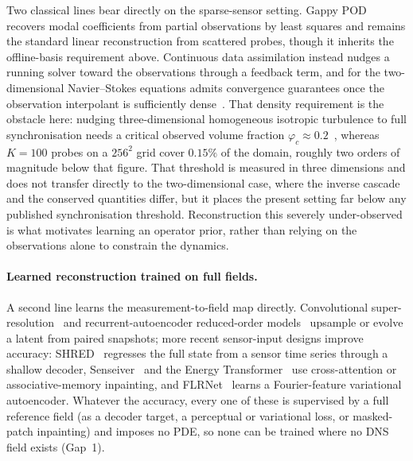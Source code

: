 Two classical lines bear directly on the sparse-sensor setting. Gappy POD~\cite{EversonSirovich1995Gappy} recovers modal coefficients from partial observations by least squares and remains the standard linear reconstruction from scattered probes, though it inherits the offline-basis requirement above. Continuous data assimilation instead nudges a running solver toward the observations through a feedback term, and for the two-dimensional Navier--Stokes equations admits convergence guarantees once the observation interpolant is sufficiently dense~\cite{Azouani2014CDA}. That density requirement is the obstacle here: nudging three-dimensional homogeneous isotropic turbulence to full synchronisation needs a critical observed volume fraction $\varphi_c \approx 0.2$~\cite{ClarkDiLeoni2020PRX}, whereas $K=100$ probes on a $256^2$ grid cover $0.15\%$ of the domain, roughly two orders of magnitude below that figure. That threshold is measured in three dimensions and does not transfer directly to the two-dimensional case, where the inverse cascade and the conserved quantities differ, but it places the present setting far below any published synchronisation threshold. Reconstruction this severely under-observed is what motivates learning an operator prior, rather than relying on the observations alone to constrain the dynamics.

\paragraph{Learned reconstruction trained on full fields.}
A second line learns the measurement-to-field map directly. Convolutional super-resolution~\cite{Fukami2019JFM} and recurrent-autoencoder reduced-order models~\cite{Maulik2021NN} upsample or evolve a latent from paired snapshots; more recent sensor-input designs improve accuracy: SHRED~\cite{Williams2024SHRED} regresses the full state from a sensor time series through a shallow decoder, Senseiver~\cite{Senseiver2023} and the Energy Transformer~\cite{EnergyTransformer2025} use cross-attention or associative-memory inpainting, and FLRNet~\cite{FLRNet2024} learns a Fourier-feature variational autoencoder. Whatever the accuracy, every one of these is supervised by a full reference field (as a decoder target, a perceptual or variational loss, or masked-patch inpainting) and imposes no PDE, so none can be trained where no DNS field exists (Gap~1).

